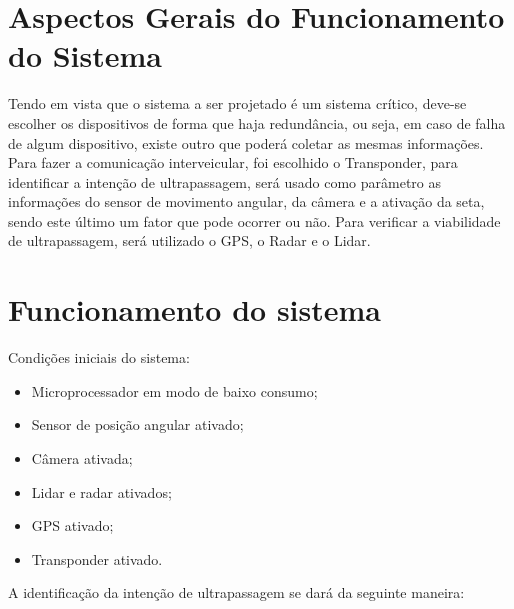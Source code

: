 \section{Aspectos Gerais do Funcionamento do Sistema}

Tendo em vista que o sistema a ser projetado é um sistema crítico, deve-se escolher os dispositivos de forma que haja redundância, ou seja, em caso de falha de algum dispositivo, existe outro que poderá coletar as mesmas informações. Para fazer a comunicação interveicular, foi escolhido o Transponder, para identificar a intenção de ultrapassagem, será usado como parâmetro as informações do sensor de movimento angular, da câmera e a ativação da seta, sendo este último um fator que pode ocorrer ou não. Para verificar a viabilidade de ultrapassagem, será utilizado o GPS, o Radar e o Lidar.

\section{Funcionamento do sistema}

Condições iniciais do sistema:

\begin{itemize}
	\item Microprocessador em modo de baixo consumo;
	\item Sensor de posição angular ativado;
	\item Câmera ativada;
	\item Lidar e radar ativados;
	\item GPS ativado;
	\item Transponder ativado.
\end{itemize}

A identificação da intenção de ultrapassagem se dará da seguinte maneira:

